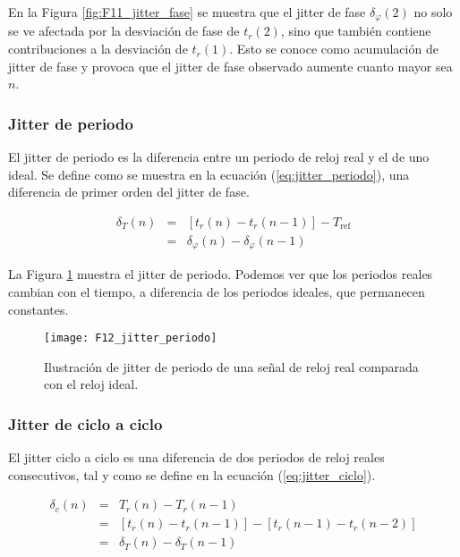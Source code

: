                 En la Figura \ref{fig:F11_jitter_fase} se muestra que el jitter de fase $\delta_{\varphi}(2)$ no solo se ve afectada por la desviación de fase de $t_{r}(2)$, sino que también contiene contribuciones a la desviación de $t_{r}(1)$. Esto se conoce como acumulación de jitter de fase y provoca que el jitter de fase observado aumente cuanto mayor sea $n$.

            \subsubsection{Jitter de periodo}

                El jitter de periodo es la diferencia entre un periodo de reloj real y el de uno ideal. Se define como se muestra en la ecuación (\ref{eq:jitter_periodo}), una diferencia de primer orden del jitter de fase.

                \begin{eqnarray}
                    \delta_{T}(n) & = & [t_{r} (n) - t_{r} (n-1)] - T_{\text{ref}}\\
                                  & = & \delta_{\varphi}(n) - \delta_{\varphi}(n-1)
                    \label{eq:jitter_periodo}
                \end{eqnarray}

                La Figura \ref{fig:F12_jitter_periodo} muestra el jitter de periodo. Podemos ver que los periodos reales cambian con el tiempo, a diferencia de los periodos ideales, que permanecen constantes.

                \begin{figure}[hbtp]
                    \caption{Ilustración de jitter de periodo de una señal de reloj real comparada con el reloj ideal.}
                    \centering
                    \texttt{[image: F12\_jitter\_periodo]}
                    \label{fig:F12_jitter_periodo}
                \end{figure}

            \subsubsection{Jitter de ciclo a ciclo}

                El jitter ciclo a ciclo es una diferencia de dos periodos de reloj reales consecutivos, tal y como se define en la ecuación (\ref{eq:jitter_ciclo}).
                
                \begin{eqnarray}
                    \delta_{c}(n) & = & T_{r} (n) - T_{r} (n-1)\\
                                  & = & [t_{r}(n) - t_{r}(n-1)] - [t_{r}(n-1) - t_{r}(n-2)] \\
                                  & = & \delta_{T}(n) - \delta_{T}(n-1)
                    \label{eq:jitter_ciclo}
                \end{eqnarray}

